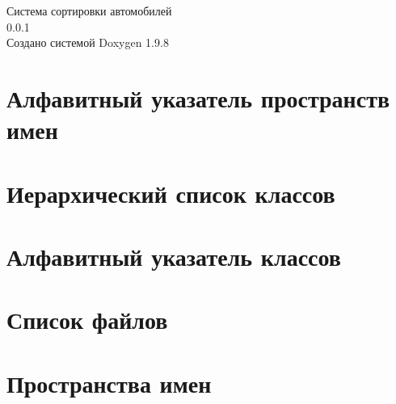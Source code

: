 \documentclass[twoside]{book}
\newcommand{\+}{\discretionary{\mbox{\scriptsize$\hookleftarrow$}}{}{}}
\newcommand{\clearemptydoublepage}{%
    \newpage{\pagestyle{empty}\cleardoublepage}%
  }
\begin{document}
  \raggedbottom
    \hypersetup{pageanchor=false,
                bookmarksnumbered=true,
                pdfencoding=unicode
               }
  \begin{titlepage}
  \vspace*{7cm}
  \begin{center}%
  {\Large Система сортировки автомобилей}\\
  [1ex]\large 0.\+0.\+1 \\
  \vspace*{1cm}
  {\large Создано системой Doxygen 1.9.8}\\
  \end{center}
  \end{titlepage}
  \clearemptydoublepage
  \tableofcontents
  \clearemptydoublepage
  \hypersetup{pageanchor=true}

\chapter{Алфавитный указатель пространств имен}

\chapter{Иерархический список классов}

\chapter{Алфавитный указатель классов}

\chapter{Список файлов}

\chapter{Пространства имен}









\end{document}
